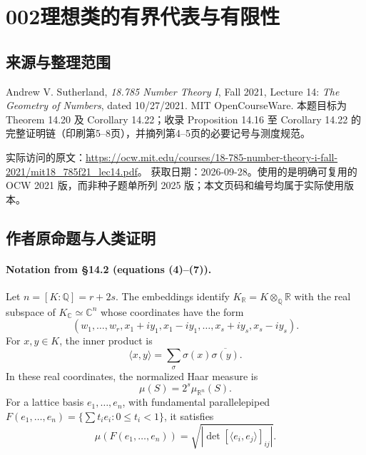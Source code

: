 \documentclass[UTF8,11pt]{ctexart}
\begin{document}
\section*{002\quad 理想类的有界代表与有限性}
\subsection*{来源与整理范围}
Andrew V. Sutherland, \emph{18.785 Number Theory I}, Fall 2021, Lecture 14: \emph{The Geometry of Numbers}, dated 10/27/2021. MIT OpenCourseWare. 本题目标为 Theorem 14.20 及 Corollary 14.22；收录 Proposition 14.16 至 Corollary 14.22 的完整证明链（印刷第5--8页），并摘列第4--5页的必要记号与测度规范。

实际访问的原文：\url{https://ocw.mit.edu/courses/18-785-number-theory-i-fall-2021/mit18_785f21_lec14.pdf}。
获取日期：2026-09-28。使用的是明确可复用的 OCW 2021 版，而非种子题单所列 2025 版；本文页码和编号均属于实际使用版本。

\subsection*{作者原命题与人类证明}
\paragraph{Notation from \S14.2 (equations (4)--(7)).}
Let $n=[K:\mathbb Q]=r+2s$. The embeddings identify $K_{\mathbb R}=K\otimes_{\mathbb Q}\mathbb R$ with the real subspace of $K_{\mathbb C}\simeq\mathbb C^n$ whose coordinates have the form
\[
(w_1,\ldots,w_r,x_1+iy_1,x_1-iy_1,\ldots,x_s+iy_s,x_s-iy_s).\tag{5}
\]
For $x,y\in K$, the inner product is
\[
\langle x,y\rangle=\sum_{\sigma}\sigma(x)\overline{\sigma(y)}.\tag{4}
\]
In these real coordinates, the normalized Haar measure is
\[
\mu(S)=2^s\mu_{\mathbb R^n}(S).\tag{6}
\]
For a lattice basis $e_1,\ldots,e_n$, with fundamental parallelepiped
$F(e_1,\ldots,e_n)=\{\sum t_i e_i:0\le t_i<1\}$, it satisfies
\[
\mu(F(e_1,\ldots,e_n))=\sqrt{|\det[\langle e_i,e_j\rangle]_{ij}|}.\tag{7}
\]
\end{document}
